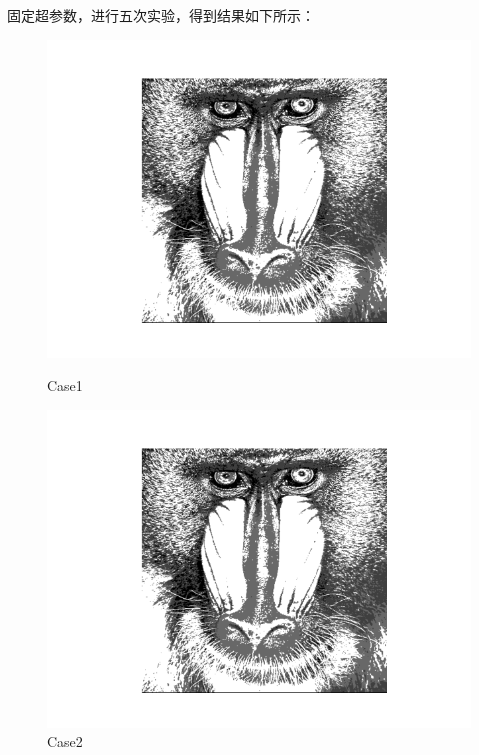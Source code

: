 \documentclass{article}
\begin{document}
固定超参数，进行五次实验，得到结果如下所示：

\begin{figure}[h]
	\begin{minipage}[t]{0.2\textwidth}%
		\centering
		\includegraphics[width=\textwidth]{PSO_1.png}
		\caption{Case1}%
		\end{minipage}
	\begin{minipage}[t]{0.2\textwidth}
		\centering
		\includegraphics[width=\textwidth]{PSO_2.png}
		\caption{Case2}
	\end{minipage}
	\begin{minipage}[t]{0.2\textwidth}
		\centering

\end{minipage}
\end{figure}
\end{document}

